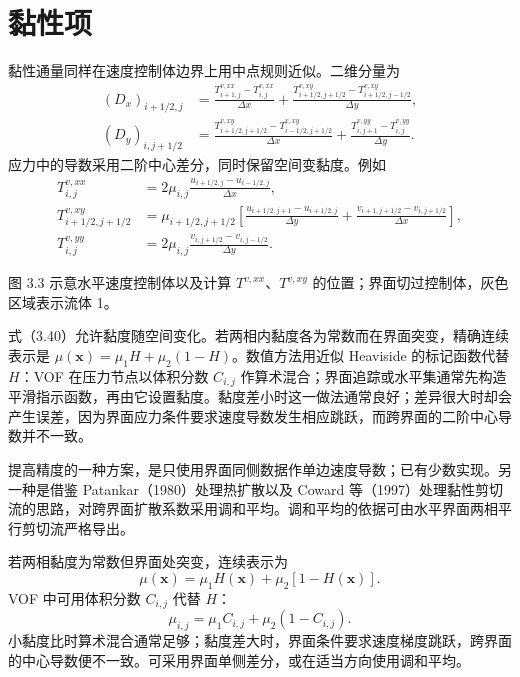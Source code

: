 \documentclass[11pt,a4paper,openany,fontset=none]{ctexbook}
\newenvironment{sourceblock}
  {\par\addvspace{0.65\baselineskip}\noindent\begin{minipage}{\linewidth}\centering}
  {\end{minipage}\par\addvspace{0.48\baselineskip}}
\begin{document}
\section{黏性项}

黏性通量同样在速度控制体边界上用中点规则近似。二维分量为
\begin{align}
 (D_x)_{i+1/2,j}&=\frac{T^{v,xx}_{i+1,j}-T^{v,xx}_{i,j}}{\Delta x}
 +\frac{T^{v,xy}_{i+1/2,j+1/2}-T^{v,xy}_{i+1/2,j-1/2}}{\Delta y}, \tag{3.38}\\
 (D_y)_{i,j+1/2}&=\frac{T^{v,xy}_{i+1/2,j+1/2}-T^{v,xy}_{i-1/2,j+1/2}}{\Delta x}
 +\frac{T^{v,yy}_{i,j+1}-T^{v,yy}_{i,j}}{\Delta y}. \tag{3.39}
\end{align}
应力中的导数采用二阶中心差分，同时保留空间变黏度。例如
\begin{align}
 T^{v,xx}_{i,j}&=2\mu_{i,j}\frac{u_{i+1/2,j}-u_{i-1/2,j}}{\Delta x},\\
 T^{v,xy}_{i+1/2,j+1/2}&=\mu_{i+1/2,j+1/2}\left[
 \frac{u_{i+1/2,j+1}-u_{i+1/2,j}}{\Delta y}
 +\frac{v_{i+1,j+1/2}-v_{i,j+1/2}}{\Delta x}\right],\\
 T^{v,yy}_{i,j}&=2\mu_{i,j}\frac{v_{i,j+1/2}-v_{i,j-1/2}}{\Delta y}. \tag{3.40}
\end{align}

图 3.3 示意水平速度控制体以及计算 $T^{v,xx}$、$T^{v,xy}$ 的位置；界面切过控制体，灰色区域表示流体 1。

\begin{sourceblock}
\end{sourceblock}

式（3.40）允许黏度随空间变化。若两相内黏度各为常数而在界面突变，精确连续表示是 $\mu(\bm x)=\mu_1H+\mu_2(1-H)$。数值方法用近似 Heaviside 的标记函数代替 $H$：VOF 在压力节点以体积分数 $C_{i,j}$ 作算术混合；界面追踪或水平集通常先构造平滑指示函数，再由它设置黏度。黏度差小时这一做法通常良好；差异很大时却会产生误差，因为界面应力条件要求速度导数发生相应跳跃，而跨界面的二阶中心导数并不一致。

提高精度的一种方案，是只使用界面同侧数据作单边速度导数；已有少数实现。另一种是借鉴 Patankar（1980）处理热扩散以及 Coward 等（1997）处理黏性剪切流的思路，对跨界面扩散系数采用调和平均。调和平均的依据可由水平界面两相平行剪切流严格导出。

若两相黏度为常数但界面处突变，连续表示为
\begin{equation}
 \mu(\bm x)=\mu_1H(\bm x)+\mu_2[1-H(\bm x)]. \tag{3.41}
\end{equation}
VOF 中可用体积分数 $C_{i,j}$ 代替 $H$：
\begin{equation}
 \mu_{i,j}=\mu_1C_{i,j}+\mu_2(1-C_{i,j}). \tag{3.42}
\end{equation}
小黏度比时算术混合通常足够；黏度差大时，界面条件要求速度梯度跳跃，跨界面的中心导数便不一致。可采用界面单侧差分，或在适当方向使用调和平均。
\end{document}
